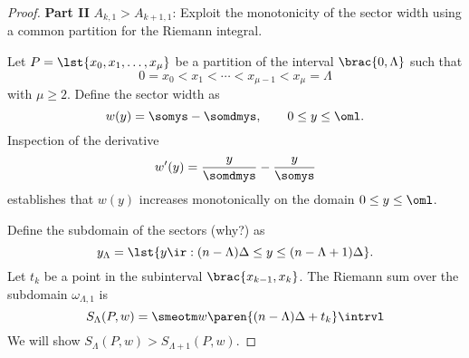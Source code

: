 \begin{proof}
\textbf{Part II} $A_{k,1} > A_{k+1,1}$: Exploit the monotonicity of the sector width using a common partition for the Riemann integral.

Let $P=\lst{x_{0}, x_{1}, \dots, x_{\mu}}$ be a partition of the interval $\brac{0,\Lambda}$ such that
\begin{equation}
  0 = x_{0} < x_{1} < \cdots < x_{\mu-1} < x_{\mu} = \Lambda
\end{equation}
with $\mu\ge2$. Define the sector width as
\begin{equation}
  w(y) = \somys - \somdmys, \qquad 0 \le y \le \oml .
\end{equation}
Inspection of the derivative
\begin{equation}
  w'(y) = \frac{y}{\somdmys} - \frac{y}{\somys}
\end{equation}
establishes that $w(y)$ increases monotonically on the domain $0 \le y \le \oml$.

Define the subdomain of the sectors (why?) as
\begin{equation}
  y_{\Lambda} = \lst{y\ir:(n-\Lambda)\Delta \le y \le (n-\Lambda+1)\Delta} .
\end{equation}
Let $t_{k}$ be a point in the subinterval $\brac{x_{k-1},x_{k}}$. The Riemann sum over the subdomain $\omega_{\Lambda,1}$ is
\begin{equation}
  S_{\Lambda} (P,w) = \smeotm w\paren{ (n-\Lambda)\Delta + t_{k} } \intrvl
\end{equation}
We will show $S_{\Lambda} (P,w) > S_{\Lambda+1} (P,w)$.


\end{proof}
